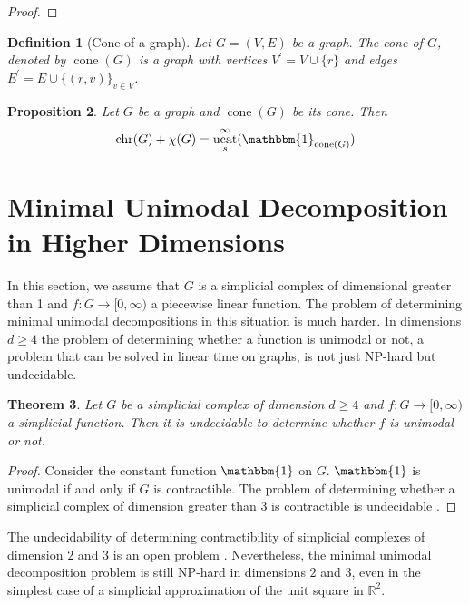 \documentclass[11pt]{article}
\DeclareMathOperator{\ucat}{ucat}
\newtheorem{thm}{Theorem}[section]
\newtheorem{prp}[thm]{Proposition}
\newtheorem{dfn}[thm]{Definition}
\newcommand{\R}{\ensuremath{\mathbb{R}}}
\DeclareMathOperator{\cone}{cone}
\DeclareMathOperator{\chr}{chr}
\begin{document}
\begin{proof}
\end{proof}

\begin{dfn}[Cone of a graph]
    Let $G = (V,E)$ be a graph. The cone of $G$, denoted by $\cone(G)$ is a graph with vertices $V^{'} = V \cup \{ r \}$ and edges $E^{'} = E \cup \{(r,v)\}_{v \in V}$.
\end{dfn}

\begin{prp}
    Let $G$ be a graph and $\cone(G)$ be its cone. Then 
    \[
        \chr(G) + \chi(G) = \ucat_s^{\infty}(\mathbbm{1}_{\cone(G)})
    \]
\end{prp}
\fi
\section{Minimal Unimodal Decomposition in Higher Dimensions}

In this section, we assume that $G$ is a simplicial complex of dimensional greater than 1 and $f : G \rightarrow [0,\infty)$ a piecewise linear function. The problem of determining minimal unimodal decompositions in this situation is much harder. In dimensions $d \geq 4$ the problem of determining whether a function is unimodal or not, a problem that can be solved in linear time on graphs, is not just NP-hard but undecidable.

\begin{thm}
Let $G$ be a simplicial complex of dimension $d \geq 4$ and  $f : G \rightarrow [0,\infty)$ a simplicial function. Then it is undecidable to determine whether $f$ is unimodal or not.
\end{thm}
\begin{proof}
Consider the constant function $\mathbbm{1}$ on $G$. $\mathbbm{1}$ is unimodal if and only if $G$ is contractible. The problem of determining whether a simplicial complex of dimension greater than 3 is contractible is undecidable \cite{Sti12, Tan16}.
\end{proof}

The undecidability of determining contractibility of simplicial complexes of dimension $2$ and $3$ is an open problem \cite{Tan16}. Nevertheless, the minimal unimodal decomposition problem is still NP-hard in dimensions $2$ and $3$, even in the simplest case of a simplicial approximation of the unit square in $\R^2$.
\end{document}
